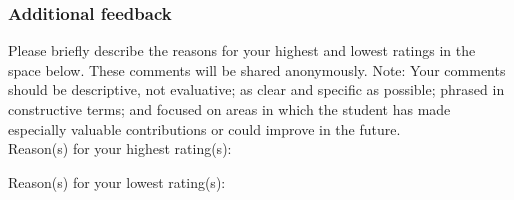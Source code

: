 \documentclass[11pt]{article}
\begin{document}
\subsubsection*{Additional feedback}

Please briefly describe the reasons for your highest and lowest ratings in the space below. These comments will be shared anonymously. Note: Your comments should be descriptive, not evaluative; as clear and specific as possible; phrased in constructive terms; and focused on areas in which the student has made especially valuable contributions or could improve in the future. \\

\noindent Reason(s) for your highest rating(s): \\

\vspace{2cm}

\noindent Reason(s) for your lowest rating(s):
\end{document}
